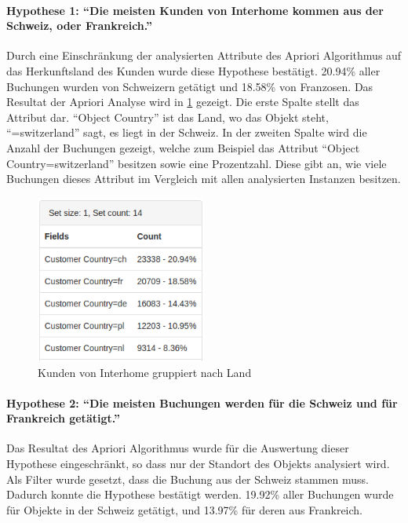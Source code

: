 \paragraph{Hypothese 1: "`Die meisten Kunden von Interhome kommen aus der Schweiz, oder Frankreich."'} Durch eine Einschränkung der analysierten Attribute des Apriori Algorithmus auf das Herkunftsland des Kunden wurde diese Hypothese bestätigt. 20.94\% aller Buchungen wurden von Schweizern getätigt und 18.58\% von Franzosen. Das Resultat der Apriori Analyse wird in \cref{fig:testingfazit:testing:hypothesen:hypothese1} gezeigt. Die erste Spalte stellt das Attribut dar. "`Object Country"' ist das Land, wo das Objekt steht, "`=switzerland"' sagt, es liegt in der Schweiz. In der zweiten Spalte wird die Anzahl der Buchungen gezeigt, welche zum Beispiel das Attribut "`Object Country=switzerland"' besitzen sowie eine Prozentzahl. Diese gibt an, wie viele Buchungen dieses Attribut im Vergleich mit allen analysierten Instanzen besitzen.

\begin{figure}[H]
	\RawFloats
	\centering
	\includegraphics[width=0.5\textwidth]{images/hypothese1}
	\caption{Kunden von Interhome gruppiert nach Land}
	\label{fig:testingfazit:testing:hypothesen:hypothese1}
\end{figure}

\paragraph{Hypothese 2: "`Die meisten Buchungen werden für die Schweiz und für Frankreich getätigt."'} Das Resultat des Apriori Algorithmus wurde für die Auswertung dieser Hypothese eingeschränkt, so dass nur der Standort des Objekts analysiert wird. Als Filter wurde gesetzt, dass die Buchung aus der Schweiz stammen muss. Dadurch konnte die Hypothese bestätigt werden. 19.92\% aller Buchungen wurde für Objekte in der Schweiz getätigt, und 13.97\% für deren aus Frankreich.

